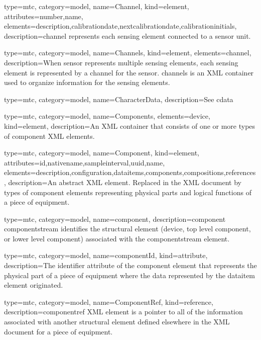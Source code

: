 {
  type=mtc,
  category=model,
  name={Channel},
  kind={element},
  attributes={\gls{number},\gls{name}},
  elements={\gls{description},\gls{calibrationdate},\gls{nextcalibrationdate},\gls{calibrationinitials}},
  description={\gls{channel} represents each \gls{sensing element} connected to a \gls{sensor unit}.}
}

{
  type=mtc,
  category=model,
  name={Channels},
  kind={element},
  elements={\gls{channel}},
  description={When \gls{sensor} represents multiple \glspl{sensing element}, each \gls{sensing element} is represented by a \gls{channel} for the \gls{sensor}. \newline \gls{channels} is an XML container used to organize information for the \glspl{sensing element}. }
}


{
  type=mtc,
  category=model,
  name={CharacterData},
  description={See \gls{cdata}}
}


{
  type=mtc,
  category=model,
  name={Components},
  elements={\gls{device}},
  kind={element},
  description={An XML container that consists of one or more types of \gls{component} XML elements. } 
}


{
  type=mtc,
  category=model,
  name={Component},
  kind={element},
  attributes={\gls{id},\gls{nativename},\gls{sampleinterval},\gls{uuid},\gls{name}},
  elements={\gls{description},\gls{configuration},\gls{dataitems},\gls{components},\glspl{composition},\gls{references}},
  description={An abstract XML element. Replaced in the XML document by types of \gls{component} elements representing physical parts and logical functions of a piece of equipment.}
}


{
  type=mtc,
  category=model,
  name={component},
  description={\gls{component componentstream} identifies the \gls{structural element} (\gls{device}, \gls{top level} \gls{component}, or \gls{lower level} \gls{component}) associated with the \gls{componentstream} element.}
}


{
  type=mtc,
  category=model,
  name={componentId},
  kind={attribute},
  description={The identifier attribute of the \gls{component} element that represents the physical part of a piece of equipment where the data represented by the \gls{dataitem} element originated.}
}


{
  type=mtc,
  category=model,
  name={ComponentRef},
  kind={reference},
  description={\gls{componentref} XML element is a pointer to all of the information associated with another \gls{structural element} defined elsewhere in the XML document for a piece of equipment. } 
}



